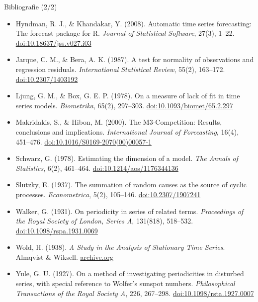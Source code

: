 \begin{frame}{Bibliografie (2/2)}
\itemsize{\scriptsize}
\begin{itemize}
    \item Hyndman, R. J., \& Khandakar, Y. (2008). Automatic time series forecasting: The forecast package for R. \textit{Journal of Statistical Software}, 27(3), 1--22. \href{https://doi.org/10.18637/jss.v027.i03}{doi:10.18637/jss.v027.i03}
    \item Jarque, C. M., \& Bera, A. K. (1987). A test for normality of observations and regression residuals. \textit{International Statistical Review}, 55(2), 163--172. \href{https://doi.org/10.2307/1403192}{doi:10.2307/1403192}
    \item Ljung, G. M., \& Box, G. E. P. (1978). On a measure of lack of fit in time series models. \textit{Biometrika}, 65(2), 297--303. \href{https://doi.org/10.1093/biomet/65.2.297}{doi:10.1093/biomet/65.2.297}
    \item Makridakis, S., \& Hibon, M. (2000). The M3-Competition: Results, conclusions and implications. \textit{International Journal of Forecasting}, 16(4), 451--476. \href{https://doi.org/10.1016/S0169-2070(00)00057-1}{doi:10.1016/S0169-2070(00)00057-1}
    \item Schwarz, G. (1978). Estimating the dimension of a model. \textit{The Annals of Statistics}, 6(2), 461--464. \href{https://doi.org/10.1214/aos/1176344136}{doi:10.1214/aos/1176344136}
    \item Slutzky, E. (1937). The summation of random causes as the source of cyclic processes. \textit{Econometrica}, 5(2), 105--146. \href{https://doi.org/10.2307/1907241}{doi:10.2307/1907241}
    \item Walker, G. (1931). On periodicity in series of related terms. \textit{Proceedings of the Royal Society of London, Series A}, 131(818), 518--532. \href{https://doi.org/10.1098/rspa.1931.0069}{doi:10.1098/rspa.1931.0069}
    \item Wold, H. (1938). \textit{A Study in the Analysis of Stationary Time Series}. Almqvist \& Wiksell. \href{https://archive.org/details/in.ernet.dli.2015.262214}{archive.org}
    \item Yule, G. U. (1927). On a method of investigating periodicities in disturbed series, with special reference to Wolfer's sunspot numbers. \textit{Philosophical Transactions of the Royal Society A}, 226, 267--298. \href{https://doi.org/10.1098/rsta.1927.0007}{doi:10.1098/rsta.1927.0007}
\end{itemize}
\end{frame}


